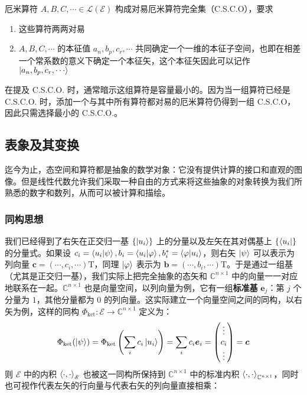 \documentclass[cn,10pt,math=newtx,citestyle=gb7714-2015,bibstyle=gb7714-2015]{elegantbook}
\def\bm{\boldsymbol}
\def\ms{\mathscr}
\def\mc{\mathcal}
\def\C{\mathbb C}
\def\T{\mathrm T}
\def\vphi{\varphi}
\def\ra{\rightarrow}
\begin{document}
\begin{definition}[对易厄米算符完全集]\label{def:CSCO}
厄米算符 $A,B,C,\cdots\in\mc L(\ms E)$ 构成对易厄米算符完全集（C.S.C.O），要求
\begin{enumerate}
    \item 这些算符两两对易
    \item $A,B,C,\cdots$ 的本征值 $a_n,b_p,c_r,\cdots$ 共同确定一个一维的本征子空间，也即在相差一个常系数的意义下确定一个本征矢，这个本征矢因此可以记作 $\ket{a_n,b_p,c_r,\cdots}$
\end{enumerate}
\end{definition}

\begin{remark}
在提及 C.S.C.O. 时，通常暗示这组算符是容量最小的。因为当一组算符已经是 C.S.C.O. 时，添加一个与其中所有算符都对易的厄米算符仍得到一组 C.S.C.O，因此只需选择最小的 C.S.C.O.。
\end{remark}

\subsection{表象及其变换}

迄今为止，态空间和算符都是抽象的数学对象：它没有提供计算的接口和直观的图像。但是线性代数允许我们采取一种自由的方式来将这些抽象的对象转换为我们所熟悉的数字和数列，从而可以被计算和描绘。

\subsubsection{同构思想}
我们已经得到了右矢在正交归一基 $\{\ket{u_i}\}$ 上的分量以及左矢在其对偶基上 $\{\bra{u_i}\}$ 的分量式。如果设 $c_i=\braket{u_i|\psi}, b_i=\braket{u_i|\vphi}, b_i^*=\braket{\vphi|u_i}$，则右矢 $\ket{\psi}$ 可以表示为列向量 $\bm c =(\cdots,c_i,\cdots)\T$，同理 $\ket{\vphi} $ 表示为 $\bm b=(\cdots,b_i,\cdots)\T$。于是通过一组基（尤其是正交归一基），我们实际上把完全抽象的态矢和 $\C^{n\times 1}$ 中的向量一一对应地联系在一起。$\C^{n\times 1}$ 也是向量空间，以列向量为例，它有一组\textbf{标准基} $\bm e_j$：第 $j$ 个分量为 $1$，其他分量都为 $0$ 的列向量。这实际建立一个向量空间之间的同构，以右矢为例，这样的同构 $\Phi_\text{ket}:\ms E\ra\C^{n\times 1}$ 定义为：
\begin{equation}
   \Phi_\text{ket}(\ket\psi) = \Phi_\text{ket}\left(\sum_i c_i\ket{u_i}\right)=\sum_i c_i\bm e_i = \begin{pmatrix}
   \vdots \\ c_i \\ \vdots
   \end{pmatrix} = \bm c
\end{equation}
则 $\ms E$ 中的内积 $\Braket{\cdot,\cdot}_{\ms E}$ 也被这一同构所保持到 $\C^{n\times 1}$ 中的标准内积 $\Braket{\cdot,\cdot}_{\C^{n\times 1}}$，同时也可视作代表左矢的行向量与代表右矢的列向量直接相乘：
\end{document}
